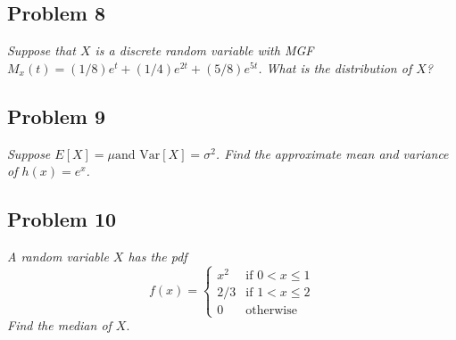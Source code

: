 \documentclass[a4paper,man,natbib]{apa6}
\begin{document}
 
 
\subsection{Problem 8}
\emph{Suppose that $X$	is a discrete random variable with MGF $M_x(t) = (1/8)e^t+(1/4)e^{2t}+(5/8)e^{5t}$.  What is the distribution of $X$?}\vspace{1em}


\subsection{Problem 9}
\emph{Suppose $E[X]= \mu \text{and Var}[X] = \sigma^2$. Find the approximate mean and variance of $h(x) = e^x$.}\vspace{1em}


\subsection{Problem 10}
\emph{A random variable $X$ has the pdf}
$$
f(x) =
\begin{cases}
	x^2 & \text{if } 0<x\leq1 \\
	2/3 & \text{if } 1<x\leq2 \\
	0 & \text{otherwise} 
\end{cases}
$$ 
\emph{Find the median of $X$}.
\vspace{1em}
\end{document}
